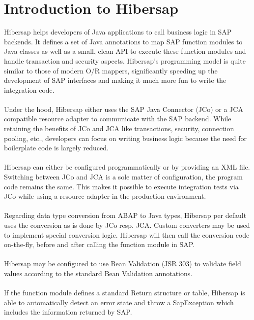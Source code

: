 \chapter{Introduction to Hibersap}

  Hibersap helps developers of Java applications to call business logic in SAP backends. 
  It defines a set of Java annotations to map SAP function modules to Java classes as well as a small, clean API
  to execute these function modules and handle transaction and security aspects. 
  Hibersap's programming model is quite similar to those of modern O/R mappers, significantly speeding up the 
  development of SAP interfaces and making it much more fun to write the integration code.
  \\ \\
  Under the hood, Hibersap either uses the SAP Java Connector (JCo) or a JCA compatible resource adapter 
  to communicate with the SAP backend. While retaining the benefits of JCo and JCA like transactions, 
  security, connection pooling, etc., developers can focus on writing business logic because the need for boilerplate
  code is largely reduced.
  \\ \\
  Hibersap can either be configured programmatically or by providing an XML file. Switching between JCo and JCA
  is a sole matter of configuration, the program code remains the same. This makes it possible to execute
  integration tests via JCo while using a resource adapter in the production environment.
  \\ \\
  Regarding data type conversion from ABAP to Java types, Hibersap per default uses the conversion as is done by 
  JCo resp. JCA. Custom converters may be used to implement special conversion logic. Hibersap will then call the
  conversion code on-the-fly, before and after calling the function module in SAP. 
  \\ \\
  Hibersap may be configured to use Bean Validation (JSR 303) to validate field values according to the standard
  Bean Validation annotations.
  \\ \\
  If the function module defines a standard Return structure or table, Hibersap is able to automatically detect 
  an error state and throw a SapException which includes the information returned by SAP.
  \\ \\
